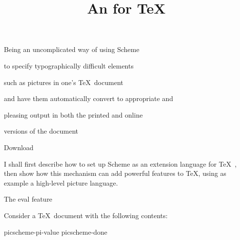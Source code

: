 





\let\n\noindent
\def\meta[#1]{{\em #1}}
\let\c\centerline
\let\f\numberedfootnote

\def\quote{\bgroup\narrower\smallbreak}
\def\endquote{\smallbreak\egroup}

\ifx\shipout\undefined
{}
\fi


\title{An {\bf\p{\eval}} for \TeX}

\c{Being an uncomplicated way of using Scheme}
\c{to specify typographically difficult elements}
\c{such as pictures in one's \TeX\ document}
\c{and have them automatically convert to appropriate
and}
\c{pleasing output in both the printed and online}
\c{versions of the document}


\medskip

\c{\htmlonly Download \endhtmlonly
{}}
\c{}

\bigskip


\n I shall first describe how to set up Scheme as an
extension language for \TeX~\cite{tex,latex}, then show how this
mechanism can add powerful features to \TeX, using
as example a high-level picture language.

\medskip

\tableofcontents

 The eval feature

Consider a \TeX\ document  with
the following contents:

\verbwritefile picscheme-pi-value
\verbwritefile picscheme-done

